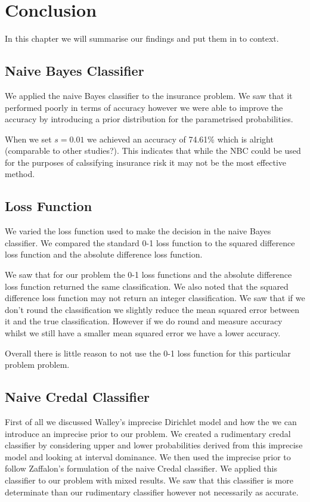 \chapter{Conclusion}

In this chapter we will summarise our findings and put them in to context.

\section{Naive Bayes Classifier}

We applied the naive Bayes classifier to the insurance problem.
We saw that it performed poorly in terms of accuracy however we were able to improve the accuracy by introducing a prior distribution for the parametrised probabilities.

When we set $s=0.01$ we achieved an accuracy of 74.61\% which is alright (comparable to other studies?).
This indicates that while the NBC could be used for the purposes of calssifying insurance risk it may not be the most effective method.

\section{Loss Function}

We varied the loss function used to make the decision in the naive Bayes classifier.
We compared the standard 0-1 loss function to the squared difference loss function and the absolute difference loss function.

We saw that for our problem the 0-1 loss functions and the absolute difference loss function returned the same classification.
We also noted that the squared difference loss function may not return an integer classification.
We saw that if we don't round the classification we slightly reduce the mean squared error between it and the true classification.
However if we do round and measure accuracy whilst we still have a smaller mean squared error we have a lower accuracy.

Overall there is little reason to not use the 0-1 loss function for this particular problem problem.

\section{Naive Credal Classifier}

First of all we discussed Walley's imprecise Dirichlet model and how the we can introduce an imprecise prior to our problem.
We created a rudimentary credal classifier by considering upper and lower probabilities derived from this imprecise model and looking at interval dominance.
We then used the imprecise prior to follow Zaffalon's formulation of the naive Credal classifier.
We applied this classifier to our problem with mixed results.
We saw that this classifier is more determinate than our rudimentary classifier however not necessarily as accurate.

